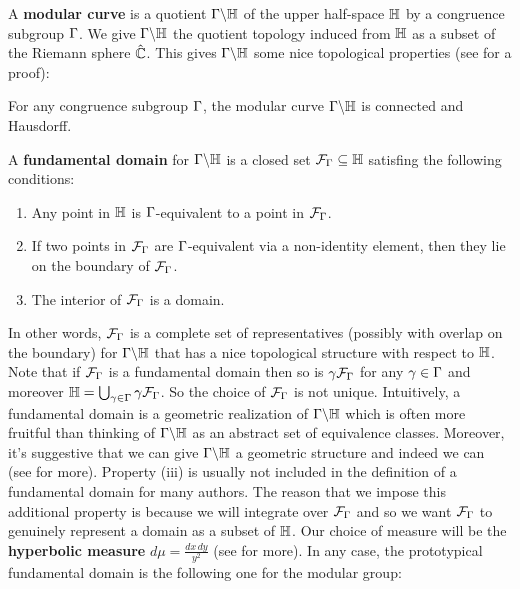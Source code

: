       A \textbf{modular curve} is a quotient $\Gamma\backslash\mathbb{H}$ of the upper half-space $\mathbb{H}$ by a congruence subgroup $\Gamma$. We give $\Gamma\backslash\mathbb{H}$ the quotient topology induced from $\mathbb{H}$ as a subset of the Riemann sphere $\hat{\mathbb{C}}$. This gives $\Gamma\backslash\mathbb{H}$ some nice topological properties (see \cite{diamond2005first} for a proof):
      
      \begin{proposition}\label{prop:modular_curves_topological_properties}
        For any congruence subgroup $\Gamma$, the modular curve $\Gamma\backslash\mathbb{H}$ is connected and Hausdorff.
      \end{proposition}

      A \textbf{fundamental domain} for $\Gamma\backslash\mathbb{H}$ is a closed set $\mathcal{F}_{\Gamma} \subseteq \mathbb{H}$ satisfing the following conditions:
      \begin{enumerate}[label=(\roman*)]
        \item Any point in $\mathbb{H}$ is $\Gamma$-equivalent to a point in $\mathcal{F}_{\Gamma}$.
        \item If two points in $\mathcal{F}_{\Gamma}$ are $\Gamma$-equivalent via a non-identity element, then they lie on the boundary of $\mathcal{F}_{\Gamma}$.
        \item The interior of $\mathcal{F}_{\Gamma}$ is a domain.
      \end{enumerate}
      In other words, $\mathcal{F}_{\Gamma}$ is a complete set of representatives (possibly with overlap on the boundary) for $\Gamma\backslash\mathbb{H}$ that has a nice topological structure with respect to $\mathbb{H}$. Note that if $\mathcal{F}_{\Gamma}$ is a fundamental domain then so is $\gamma\mathcal{F}_{\Gamma}$ for any $\gamma \in \Gamma$ and moreover $\mathbb{H} = \bigcup_{\gamma \in \Gamma}\gamma\mathcal{F}_{\Gamma}$. So the choice of $\mathcal{F}_{\Gamma}$ is not unique. Intuitively, a fundamental domain is a geometric realization of $\Gamma\backslash\mathbb{H}$ which is often more fruitful than thinking of $\Gamma\backslash\mathbb{H}$ as an abstract set of equivalence classes. Moreover, it's suggestive that we can give $\Gamma\backslash\mathbb{H}$ a geometric structure and indeed we can (see \cite{diamond2005first} for more). Property (iii) is usually not included in the definition of a fundamental domain for many authors. The reason that we impose this additional property is because we will integrate over $\mathcal{F}_{\Gamma}$ and so we want $\mathcal{F}_{\Gamma}$ to genuinely represent a domain as a subset of $\mathbb{H}$. Our choice of measure will be the \textbf{hyperbolic measure} $d\mu = \frac{dx\,dy}{y^{2}}$ (see \cite{diamond2005first} for more). In any case, the prototypical fundamental domain is the following one for the modular group:

